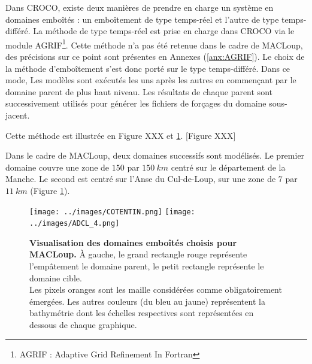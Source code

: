\documentclass[10pt,a4paper,titlepage]{article}
\begin{document}
Dans CROCO, existe deux manières de prendre en charge un système en domaines emboîtés : un emboîtement de type temps-réel et l'autre de type temps-différé.
La méthode de type temps-réel est prise en charge dans CROCO via le module AGRIF\footnote{AGRIF : Adaptive Grid Refinement In Fortran}.
Cette méthode n'a pas été retenue dans le cadre de MACLoup, des précisions sur ce point sont présentes en Annexes (\ref{anx:AGRIF}).
Le choix de la méthode d'emboîtement s'est donc porté sur le type temps-différé.
Dans ce mode, Les modèles sont exécutés les uns après les autres en commençant par le domaine parent de plus haut niveau.
Les résultats de chaque parent sont successivement utilisés pour générer les fichiers de forçages du domaine sous-jacent.

Cette méthode est illustrée en Figure XXX et \ref{fig:imbrication}.
[Figure XXX]

Dans le cadre de MACLoup, deux domaines successifs sont modélisés.
Le premier domaine couvre une zone de $150$ par $150~km$ centré sur le département de la Manche.
Le second est centré sur l'Anse du Cul-de-Loup, sur une zone de $7$ par $11~km$ (Figure \ref{fig:imbrication}).



\begin{figure}[h!]
\centering
\texttt{[image: ../images/COTENTIN.png]}
\texttt{[image: ../images/ADCL\_4.png]}
\caption{
    \textbf{Visualisation des domaines emboîtés choisis pour MACLoup.}
    À gauche, le grand rectangle rouge représente l'empâtement le domaine parent, le petit rectangle représente le domaine cible.
    \\
    Les pixels oranges sont les maille considérées comme obligatoirement émergées.
    Les autres couleurs (du bleu au jaune) représentent la bathymétrie dont les échelles respectives sont représentées en dessous de chaque graphique.
}
\label{fig:imbrication}
\end{figure}

\end{document}
